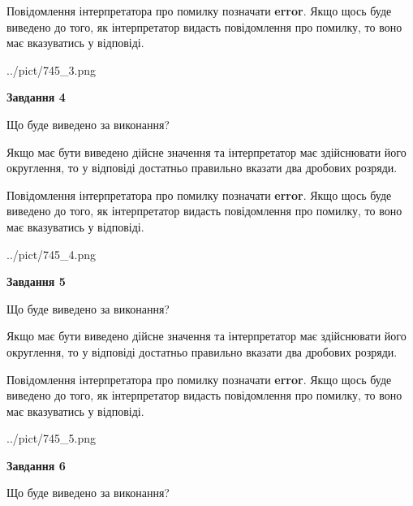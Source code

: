 \documentclass[12pt, ukrainian]{article}
\begin{document}
{\begin {Large}
Повідомлення інтерпретатора про помилку позначати \textbf{error}.
Якщо щось буде виведено до того, як інтерпретатор видасть повідомлення про помилку, 
то воно має вказуватись у відповіді. \par

\begin{center}
	{../pict/745_3.png}
\end{center}
\newpage

{\begin {center}\textbf{Завдання 4}\end {center}}\par
Що буде виведено за виконання? \par

Якщо має бути виведено дійсне значення та інтерпретатор має здійснювати його округлення, 
то у відповіді достатньо правильно вказати два дробових розряди.

Повідомлення інтерпретатора про помилку позначати \textbf{error}.
Якщо щось буде виведено до того, як інтерпретатор видасть повідомлення про помилку, 
то воно має вказуватись у відповіді. \par

\begin{center}
	{../pict/745_4.png}
\end{center}
\newpage

{\begin {center}\textbf{Завдання 5}\end {center}}\par
Що буде виведено за виконання? \par

Якщо має бути виведено дійсне значення та інтерпретатор має здійснювати його округлення, 
то у відповіді достатньо правильно вказати два дробових розряди.

Повідомлення інтерпретатора про помилку позначати \textbf{error}.
Якщо щось буде виведено до того, як інтерпретатор видасть повідомлення про помилку, 
то воно має вказуватись у відповіді. \par

\begin{center}
	{../pict/745_5.png}
\end{center}
\newpage

{\begin {center}\textbf{Завдання 6}\end {center}}\par
Що буде виведено за виконання? \par


\end{Large}}
\end{document}
